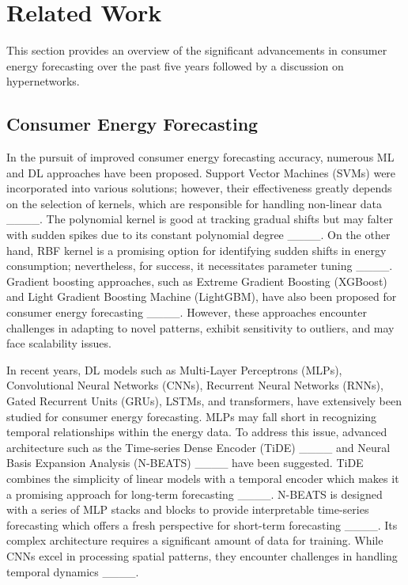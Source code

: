 \section{Related Work}
\label{sec:relwork}
This section provides an overview of the significant advancements in {consumer energy} forecasting over the past five years followed by a discussion on hypernetworks. 

\subsection{ {Consumer Energy} Forecasting}
In the pursuit of improved {consumer energy} forecasting accuracy, numerous ML and DL approaches have been proposed. Support Vector Machines (SVMs) were incorporated into various solutions; however, their effectiveness greatly depends on the selection of kernels, which are responsible for handling non-linear data ____. The polynomial kernel is good at tracking gradual shifts but may falter with sudden spikes due to its constant polynomial degree ____. On the other hand, RBF kernel is a promising option for identifying sudden shifts in energy consumption; nevertheless, for success, it necessitates parameter tuning ____. Gradient boosting approaches, such as Extreme Gradient Boosting (XGBoost) and Light Gradient Boosting Machine (LightGBM), have also been proposed for {consumer energy} forecasting {____}. However, these approaches encounter challenges in adapting to novel patterns, exhibit sensitivity to outliers, and may face scalability issues.

In recent years, DL models such as Multi-Layer Perceptrons (MLPs), Convolutional Neural Networks (CNNs), Recurrent Neural Networks (RNNs), Gated Recurrent Units (GRUs), LSTMs, and transformers, have extensively been studied for {consumer energy} forecasting. MLPs may fall short in recognizing temporal relationships within the energy data. To address this issue, advanced architecture such as the Time-series Dense Encoder (TiDE) ____ and Neural Basis Expansion Analysis (N-BEATS) ____ have been suggested. TiDE combines the simplicity of linear models with a temporal encoder which makes it a promising approach for long-term forecasting ____. N-BEATS is designed with a series of MLP stacks and blocks to provide interpretable time-series forecasting which offers a fresh perspective for short-term forecasting ____. Its complex architecture requires a significant amount of data for training. While CNNs excel in processing spatial patterns, they encounter challenges in handling temporal dynamics ____.

